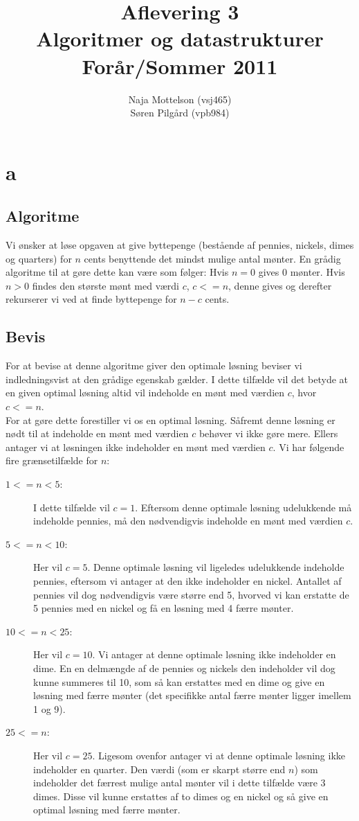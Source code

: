 \documentclass[10pt,a4paper,danish]{article}
\title{Aflevering 3 \\Algoritmer og datastrukturer\\Forår/Sommer 2011}
\author{Naja Mottelson (vsj465)\\Søren Pilgård (vpb984)}
\begin{document}
\maketitle
\newpage

\tableofcontents
\newpage

\section{a}
\subsection{Algoritme}
Vi ønsker at løse opgaven at give byttepenge (bestående af pennies, nickels, dimes og quarters)
for $n$ cents benyttende det mindst mulige antal mønter. En grådig algoritme til at gøre dette kan være
som følger: Hvis $n = 0$ gives 0 mønter. Hvis $n > 0$ findes den største
mønt med værdi $c$, $c<=n$, denne gives og derefter rekurserer vi ved at finde byttepenge for $n-c$ cents.

\subsection{Bevis}
For at bevise at denne algoritme giver den optimale løsning beviser vi indledningsvist at den 
grådige egenskab gælder. I dette tilfælde vil det betyde at en given optimal løsning altid vil
indeholde en mønt med værdien $c$, hvor $c<=n$.
\\
For at gøre dette forestiller vi os en optimal løsning. Såfremt denne løsning er nødt til at indeholde
en mønt med værdien $c$ behøver vi ikke gøre mere. Ellers antager vi at løsningen ikke indeholder en 
mønt med værdien $c$. Vi har følgende fire grænsetilfælde for $n$: 

\begin{description}
\item[$1 <= n < 5$:] I dette tilfælde vil $c = 1$. Eftersom denne optimale løsning udelukkende må indeholde
pennies, må den nødvendigvis indeholde en mønt med værdien $c$. 
\item[$5 <= n < 10$:] Her vil $c = 5$. Denne optimale løsning vil ligeledes udelukkende indeholde pennies, 
eftersom vi antager at den ikke indeholder en nickel. Antallet af pennies vil dog nødvendigvis være større 
end 5, hvorved vi kan erstatte de 5 pennies med en nickel og få en løsning med 4 færre mønter. 
\item[$10 <= n < 25$:] Her vil $c = 10$. Vi antager at denne optimale løsning ikke indeholder en dime. En 
en delmængde af de pennies og nickels den indeholder vil dog kunne summeres til 10, som så kan erstattes med
en dime og give en løsning med færre mønter (det specifikke antal færre mønter ligger imellem 1 og 9).
\item[$25 <= n$:] Her vil $c = 25$. Ligesom ovenfor antager vi at denne optimale løsning ikke indeholder
en quarter. Den værdi (som er skarpt større end $n$) som indeholder det færrest mulige antal mønter vil i 
dette tilfælde være 3 dimes. Disse vil kunne erstattes af to dimes og en nickel og så give en optimal løsning
med færre mønter. 
\end{description}
\end{document}
